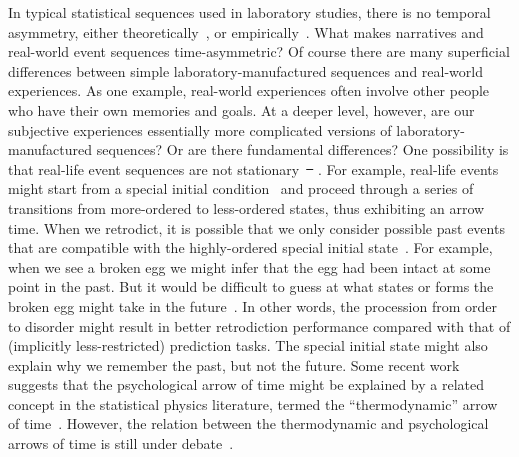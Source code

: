 \documentclass[10pt]{article}
\providecommand{\DIFaddtex}[1]{{\protect\color{blue}\uwave{#1}}} %
\providecommand{\DIFdeltex}[1]{{\protect\color{red}\sout{#1}}}                      %
\providecommand{\DIFaddbegin}{} %
\providecommand{\DIFaddend}{} %
\providecommand{\DIFdelbegin}{} %
\providecommand{\DIFdelend}{} %
\providecommand{\DIFadd}[1]{\texorpdfstring{\DIFaddtex{#1}}{#1}} %
\providecommand{\DIFdel}[1]{\texorpdfstring{\DIFdeltex{#1}}{}} %
\newcommand{\DIFscaledelfig}{0.5}
\newlength{\DIFdelgraphicswidth} %
\newlength{\DIFdelgraphicsheight} %
\newcommand{\DIFaddincludegraphics}[2][]{{\color{blue}\fbox{\DIFOincludegraphics[#1]{#2}}}} %
\newcommand{\DIFdelincludegraphics}[2][]{%
\sbox{\DIFdelgraphicsbox}{\DIFOincludegraphics[#1]{#2}}%
\settoboxwidth{\DIFdelgraphicswidth}{\DIFdelgraphicsbox} %
\settoboxtotalheight{\DIFdelgraphicsheight}{\DIFdelgraphicsbox} %
\scalebox{\DIFscaledelfig}{%
\parbox[b]{\DIFdelgraphicswidth}{\usebox{\DIFdelgraphicsbox}\\[-\baselineskip] \rule{\DIFdelgraphicswidth}{0em}}\llap{\resizebox{\DIFdelgraphicswidth}{\DIFdelgraphicsheight}{%
\setlength{\unitlength}{\DIFdelgraphicswidth}%
\begin{picture}(1,1)%
\thicklines\linethickness{2pt} %
{\color[rgb]{1,0,0}\put(0,0){\framebox(1,1){}}}%
{\color[rgb]{1,0,0}\put(0,0){\line( 1,1){1}}}%
{\color[rgb]{1,0,0}\put(0,1){\line(1,-1){1}}}%
\end{picture}%
}\hspace*{3pt}}} %
} %
\DeclareRobustCommand{\DIFaddbegin}{\DIFOaddbegin \let\includegraphics\DIFaddincludegraphics} %
\DeclareRobustCommand{\DIFaddend}{\DIFOaddend \let\includegraphics\DIFOincludegraphics} %
\DeclareRobustCommand{\DIFdelbegin}{\DIFOdelbegin \let\includegraphics\DIFdelincludegraphics} %
\DeclareRobustCommand{\DIFdelend}{\DIFOaddend \let\includegraphics\DIFOincludegraphics} %
\begin{document}
In typical statistical sequences used in laboratory studies, there is no
temporal asymmetry, either theoretically~\citep{Cove94, BialEtal01,
ElliEtal09}, or empirically~\citep{JonePash07}. What makes narratives and
real-world event sequences time-asymmetric? Of course there are many
superficial differences between simple laboratory-manufactured sequences and
real-world experiences. As one example, real-world experiences often involve
other people who have their own memories and goals. At a deeper level, however,
are our subjective experiences essentially more complicated versions of
laboratory-manufactured sequences? Or are there fundamental differences? One
possibility is that real-life event sequences are not stationary~\DIFdelbegin \DIFdel{\mbox{%
\citep[i.e., not in equilibrium,][]{Cove94}}\hskip0pt%
}\DIFdelend \DIFaddbegin \DIFadd{\mbox{%
\citep[i.e.,
not in equilibrium; ][]{Cove94}}\hskip0pt%
}\DIFaddend . For example, real-life events might start from
a special initial condition~\citep{Albe00, Feyn65, Cove94} and proceed through
a series of transitions from more-ordered to less-ordered states, thus
exhibiting an arrow time. When we retrodict, it is possible that we only
consider possible past events that are compatible with the highly-ordered
special initial state~\citep{Carr10, Carr16}. For example, when we see a broken
egg we might infer that the egg had been intact at some point in the past. But
it would be difficult to guess at what states or forms the broken egg might
take in the future~\citep{Carr10, Carr16}. In other words, the procession from
order to disorder might result in better retrodiction performance compared with
that of (implicitly less-restricted) prediction tasks. The special initial
state might also explain why we remember the past, but not the future. Some
recent work suggests that the psychological arrow of time might be explained by
a related concept in the statistical physics literature, termed the
``thermodynamic'' arrow of time~\citep{MlodBrun14, Rove22}. However, the
relation between the thermodynamic and psychological arrows of time is still
under debate~\citep{Golo21, HemmShen19}.
\end{document}
